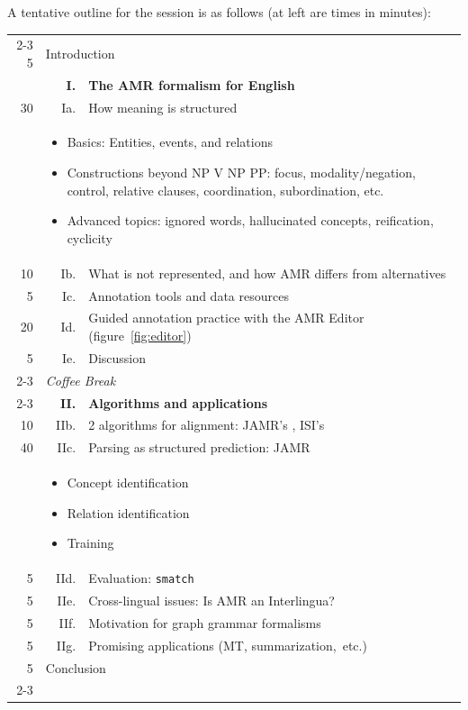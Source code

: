 \documentclass[11pt,letterpaper]{article}
\newcommand{\fref}[1]{figure~\ref{#1}}
\begin{document}
A tentative outline for the session is as follows 
(at left are times in minutes):
\begin{center}\small
\hypersetup{citecolor=mdblue}
\noindent\begin{tabular}{@{}r@{~~}|r@{~}p{19em}|@{}}
\cline{2-3}
5 & \multicolumn{2}{l|}{Introduction}\\
  & \textbf{I.} & \textbf{The AMR formalism for English} \citep{amr,amr-guidelines}\\
30 & Ia. & How meaning is structured\\
  & \multicolumn{2}{l|}{\parbox{20em}{\begin{itemize}
	\item Basics: Entities, events, and relations
	\item Constructions beyond NP V NP PP: focus, modality/negation, control, 
relative clauses, coordination, subordination, etc.
	\item Advanced topics: ignored words, hallucinated concepts, reification, cyclicity %
\end{itemize}}} \\
10 & Ib. & What is not represented, and how AMR differs from alternatives\\
 5 & Ic. & Annotation tools and data resources\\
20 & Id. & Guided annotation practice with the AMR Editor (\fref{fig:editor})\\
 5 & Ie. & Discussion\\
\cline{2-3}
\multicolumn{1}{@{}r}{15} & \multicolumn{2}{l}{\textit{Coffee Break}}\\
\cline{2-3}
  & \textbf{II.} & \textbf{Algorithms and applications}\\
10 & IIb. & 2 algorithms for alignment: JAMR's \citep{flanigan-14}, ISI's \citep{pourdamghani-14} \\
40 & IIc. & Parsing as structured prediction: JAMR \citep{flanigan-14} \\
  & \multicolumn{2}{l|}{\parbox{20em}{\begin{itemize}
	\item Concept identification
	\item Relation identification
	\item Training
\end{itemize}}} \\
 5 & IId. & Evaluation: \texttt{smatch} \citep{cai-13} \\
 5 & IIe. & Cross-lingual issues: Is AMR an Interlingua? \citep{xue-14} \\
 5 & IIf. & Motivation for graph grammar formalisms \citep{braune-14} \\
 5 & IIg. & Promising applications (MT, summarization,~etc.) \\
 5 & \multicolumn{2}{l|}{Conclusion}\\
\cline{2-3}
\end{tabular}
\end{center}
\end{document}
